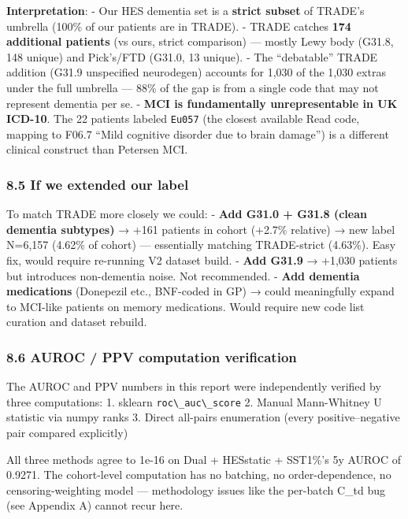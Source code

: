 \documentclass[
  11pt,
]{article}
\newcommand{\passthrough}[1]{#1}
\begin{document}
\textbf{Interpretation}: - Our HES dementia set is a \textbf{strict
subset} of TRADE's umbrella (100\% of our patients are in TRADE). -
TRADE catches \textbf{174 additional patients} (vs ours, strict
comparison) --- mostly Lewy body (G31.8, 148 unique) and Pick's/FTD
(G31.0, 13 unique). - The ``debatable'' TRADE addition (G31.9
unspecified neurodegen) accounts for 1,030 of the 1,030 extras under the
full umbrella --- 88\% of the gap is from a single code that may not
represent dementia per se. - \textbf{MCI is fundamentally
unrepresentable in UK ICD-10}. The 22 patients labeled
\passthrough{\lstinline!Eu057!} (the closest available Read code,
mapping to F06.7 ``Mild cognitive disorder due to brain damage'') is a
different clinical construct than Petersen MCI.

\subsubsection{8.5 If we extended our
label}\label{if-we-extended-our-label}

To match TRADE more closely we could: - \textbf{Add G31.0 + G31.8 (clean
dementia subtypes)} → +161 patients in cohort (+2.7\% relative) → new
label N=6,157 (4.62\% of cohort) --- essentially matching TRADE-strict
(4.63\%). Easy fix, would require re-running V2 dataset build. -
\textbf{Add G31.9} → +1,030 patients but introduces non-dementia noise.
Not recommended. - \textbf{Add dementia medications} (Donepezil etc.,
BNF-coded in GP) → could meaningfully expand to MCI-like patients on
memory medications. Would require new code list curation and dataset
rebuild.

\subsubsection{8.6 AUROC / PPV computation
verification}\label{auroc-ppv-computation-verification}

The AUROC and PPV numbers in this report were independently verified by
three computations: 1. sklearn \passthrough{\lstinline!roc\_auc\_score!}
2. Manual Mann-Whitney U statistic via numpy ranks 3. Direct all-pairs
enumeration (every positive--negative pair compared explicitly)

All three methods agree to 1e-16 on Dual + HESstatic + SST1\%'s 5y AUROC
of 0.9271. The cohort-level computation has no batching, no
order-dependence, no censoring-weighting model --- methodology issues
like the per-batch C\_td bug (see Appendix A) cannot recur here.
\end{document}

